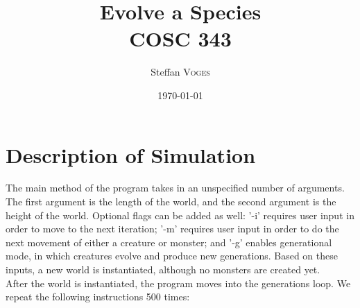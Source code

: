 \documentclass{article}
\title{Evolve a Species \\ COSC 343} %
\author{Steffan \textsc{Voges}} %
\date{\today} %
\begin{document}
\maketitle %



\section{Description of Simulation}
\hspace{10 pt} The main method of the program takes in an unspecified number of arguments.  The first argument is the length of the world, and the second argument is the height of the world.  Optional flags can be added as well: '-i' requires user input in order to move to the next iteration; '-m' requires user input in order to do the next movement of either a creature or monster; and '-g' enables generational mode, in which creatures evolve and produce new generations.  Based on these inputs, a new world is instantiated, although no monsters are created yet. \\

\hspace{10 pt} After the world is instantiated, the program moves into the generations loop.  We repeat the following instructions 500 times: \\
\end{document}
